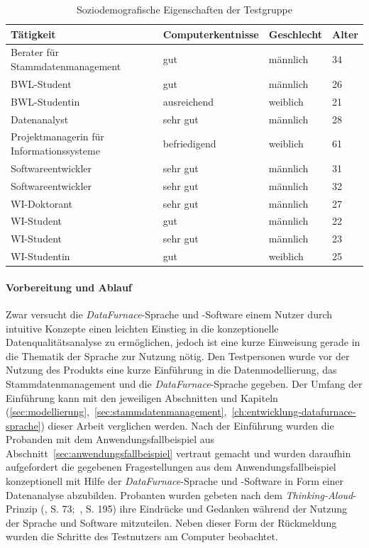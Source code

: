 \documentclass[
  language=german, %
  type=bachelor,%
  ngerman
]{isthesis}
\begin{document}
\begin{content}
  \begin{table}[]
    \footnotesize
    \begin{tabular}{l l l l}
      Tätigkeit & Computerkentnisse & Geschlecht & Alter \\
      \toprule
      Berater für Stammdatenmanagement & gut & männlich & 34 \\
      \acrshort{BWL}-Student & gut & männlich & 26 \\
      \acrshort{BWL}-Studentin & ausreichend & weiblich & 21 \\
      Datenanalyst & sehr gut & männlich & 28 \\
      Projektmanagerin für Informationssysteme & befriedigend & weiblich & 61\\
      Softwareentwickler & sehr gut & männlich & 31 \\
      Softwareentwickler & sehr gut & männlich & 32 \\
      \acrshort{WI}-Doktorant & sehr gut & männlich & 27 \\
      \acrshort{WI}-Student & gut & männlich & 22 \\
      \acrshort{WI}-Student & sehr gut & männlich & 23 \\
      \acrshort{WI}-Studentin & gut & weiblich & 25 \\
    \end{tabular}
    \caption{Soziodemografische Eigenschaften der Testgruppe}\label{table:testgruppe}
  \end{table}

\paragraph{Vorbereitung und Ablauf} Zwar versucht die
\textit{DataFurnace}-Sprache und -Software einem Nutzer durch intuitive
Konzepte einen leichten Einstieg in die konzeptionelle Datenqualitätsanalyse zu
ermöglichen, jedoch ist eine kurze Einweisung gerade in die Thematik der
Sprache zur Nutzung nötig. Den Testpersonen wurde vor der Nutzung des Produkts
eine kurze Einführung in die Datenmodellierung, das Stammdatenmanagement und
die \textit{DataFurnace}-Sprache gegeben. Der Umfang der Einführung kann mit
den jeweiligen Abschnitten und Kapiteln
(\ref{sec:modellierung},~\ref{sec:stammdatenmanagement},~\ref{ch:entwicklung-datafurnace-sprache})
dieser Arbeit verglichen werden.  Nach der Einführung wurden die Probanden mit
dem Anwendungsfallbeispiel aus Abschnitt~\ref{sec:anwendungsfallbeispiel}
vertraut gemacht und wurden daraufhin aufgefordert die gegebenen
Fragestellungen aus dem Anwendungsfallbeispiel konzeptionell mit Hilfe der
\textit{DataFurnace}-Sprache und -Software in Form einer Datenanalyse
abzubilden. Probanten wurden gebeten nach dem \textit{Thinking-Aloud}-Prinzip
(\cite{holzinger2005usability}, S.  73;~\cite{nielsen1994usability}, S. 195)
ihre Eindrücke und Gedanken während der Nutzung der Sprache und Software
mitzuteilen. Neben dieser Form der Rückmeldung wurden die Schritte des
Testnutzers am Computer beobachtet.


\end{content}
\end{document}
